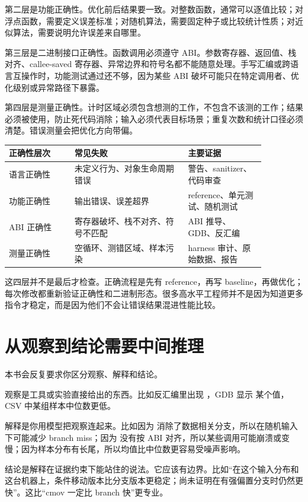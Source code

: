 第二层是功能正确性。优化前后结果要一致。对整数函数，通常可以逐值比较；对浮点函数，需要定义误差标准；对随机算法，需要固定种子或比较统计性质；对近似算法，需要说明允许误差来自哪里。

第三层是二进制接口正确性。函数调用必须遵守 ABI。参数寄存器、返回值、栈对齐、callee-saved 寄存器、异常边界和符号名都不能随意处理。手写汇编或跨语言互操作时，功能测试通过还不够，因为某些 ABI 破坏可能只在特定调用者、优化级别或异常路径下暴露。

第四层是测量正确性。计时区域必须包含想测的工作，不包含不该测的工作；结果必须被使用，防止死代码消除；输入必须代表目标场景；重复次数和统计口径必须清楚。错误测量会把优化方向带偏。

\begin{center}
\begin{tabular}{p{0.22\linewidth}p{0.38\linewidth}p{0.26\linewidth}}
\toprule
正确性层次 & 常见失败 & 主要证据 \\
\midrule
语言正确性 & 未定义行为、对象生命周期错误 & 警告、sanitizer、代码审查 \\
功能正确性 & 输出错误、误差超界 & reference、单元测试、随机测试 \\
ABI 正确性 & 寄存器破坏、栈不对齐、符号不匹配 & ABI 推导、GDB、反汇编 \\
测量正确性 & 空循环、测错区域、样本污染 & harness 审计、原始数据、报告 \\
\bottomrule
\end{tabular}
\end{center}

这四层并不是最后才检查。正确流程是先有 reference，再写 baseline，再做优化；每次修改都重新验证正确性和二进制形态。很多高水平工程师并不是因为知道更多指令才稳定，而是因为他们不会让错误结果混进性能比较。

\section{从观察到结论需要中间推理}

本书会反复要求你区分观察、解释和结论。

观察是工具或实验直接给出的东西。比如反汇编里出现 ，GDB 显示  某个值，CSV 中某组样本中位数更低。

解释是你用模型把观察连起来。比如因为  消除了数据相关分支，所以在随机输入下可能减少 branch miss；因为  没有按 ABI 对齐，所以某些调用可能崩溃或变慢；因为样本分布有长尾，所以均值比中位数更容易受噪声影响。

结论是解释在证据约束下能站住的说法。它应该有边界。比如“在这个输入分布和这台机器上，条件移动版本比分支版本更稳定；尚未证明在有强偏置分支时仍然更快”。这比“cmov 一定比 branch 快”更专业。

